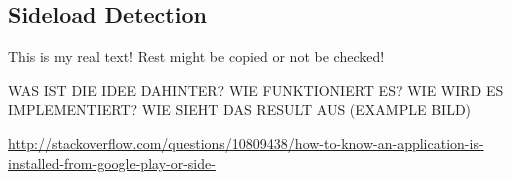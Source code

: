 \subsection{Sideload Detection} \label{subsection:counter-tampering-sideload}
This is my real text! Rest might be copied or not be checked!



WAS IST DIE IDEE DAHINTER? WIE FUNKTIONIERT ES? WIE WIRD ES IMPLEMENTIERT? WIE SIEHT DAS RESULT AUS (EXAMPLE BILD)\newline

\url{http://stackoverflow.com/questions/10809438/how-to-know-an-application-is-installed-from-google-play-or-side-}


